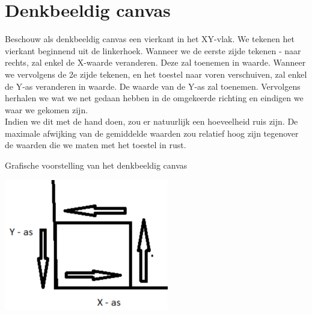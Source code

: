 \documentclass{article}
\begin{document}
\section{Denkbeeldig canvas}
\begin{minipage}{.60\textwidth}
  Beschouw als denkbeeldig canvas een vierkant in het XY-vlak. We tekenen het vierkant beginnend uit de linkerhoek.
Wanneer we de eerste zijde tekenen - naar rechts, zal enkel de X-waarde veranderen. Deze zal toenemen in waarde. Wanneer we vervolgens de 2e zijde tekenen, en het toestel naar voren verschuiven, zal enkel de Y-as veranderen in waarde. De waarde van de Y-as zal toenemen. Vervolgens herhalen we wat we net gedaan hebben in de omgekeerde richting en eindigen we waar we gekomen zijn.
\\ Indien we dit met de hand doen, zou er natuurlijk een hoeveelheid ruis zijn. De maximale afwijking van de gemiddelde waarden zou relatief hoog zijn tegenover de waarden die we maten met het toestel in rust. 
\end{minipage}
\begin{minipage}{.40\textwidth}
  \centering
  \caption{Grafische voorstelling van het denkbeeldig canvas}
  \includegraphics[width=.8\linewidth]{figures/andereAfb/denkbeeldigCanvas.png}
  \label{wrap-fig:5}
\end{minipage}
\end{document}
